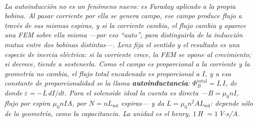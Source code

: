 \begin{center}
\begin{tikzpicture}[scale=1]
\end{tikzpicture}\\[0.5em]
{\small\itshape La autoinducción no es un fenómeno nuevo: es Faraday aplicado a
la propia bobina. Al pasar corriente por ella se genera campo, ese campo produce
flujo a través de sus mismas espiras, y si la corriente cambia, el flujo cambia
y aparece una FEM \emph{sobre ella misma} ---por eso ``auto'', para
distinguirla de la inducción mutua entre dos bobinas distintas---. Lenz fija el
sentido y el resultado es una especie de inercia eléctrica: si la corriente
crece, la FEM se opone al crecimiento; si decrece, tiende a sostenerla. Como el
campo es proporcional a la corriente y la geometría no cambia, el flujo total
encadenado es proporcional a $I$, y a esa constante de proporcionalidad se la
llama \textbf{autoinductancia}: $\Phi_B^{\text{total}} = L\,I$, de donde
$\varepsilon = -L\,dI/dt$. Para el solenoide ideal la cuenta es directa
---$B=\mu_0 n I$, flujo por espira $\mu_0 n I A$, por $N=n L_{\text{sol}}$
espiras--- y da $L = \mu_0 n^2 A L_{\text{sol}}$: depende sólo de la geometría,
como la capacitancia. La unidad es el henry, $1\,$H $=1\,$V$\cdot$s/A.}
\end{center}
